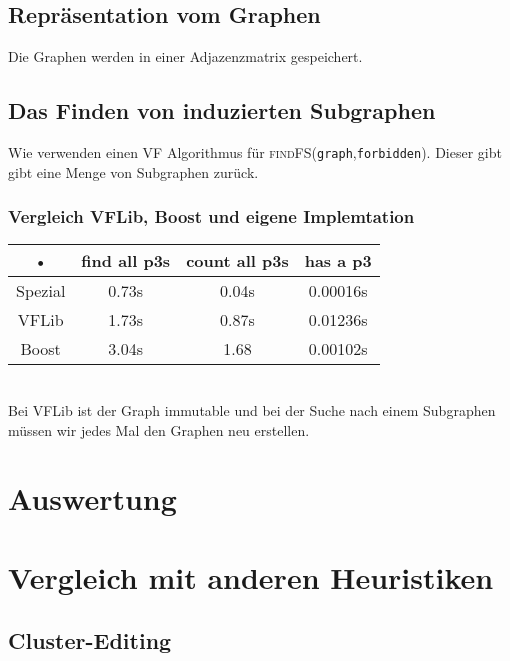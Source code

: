 \documentclass[12pt,a4paper,onecolumn,oneside,titlepage]{article}
\newcommand{\vars}{\texttt}
\newcommand{\func}{\textsc}
\begin{document}
\subsection{Repräsentation vom Graphen}
Die Graphen werden in einer Adjazenzmatrix gespeichert.


\subsection{Das Finden von induzierten Subgraphen}
\cite{Ullmann76}
Wie verwenden einen VF Algorithmus für \func{findFS}(\vars{graph},\vars{forbidden}).
Dieser gibt gibt eine Menge von Subgraphen zurück.

\subsubsection{Vergleich VFLib, Boost und eigene Implemtation}
\begin{tabular}{|c|c|c|c|}
\hline 
• & find all p3s & count all p3s & has a p3 \\ 
\hline 
Spezial & 0.73s & 0.04s & 0.00016s \\ 
\hline 
VFLib & 1.73s & 0.87s & 0.01236s \\ 
\hline 
Boost & 3.04s & 1.68 & 0.00102s \\ 
\hline 
\end{tabular} 
\\

Bei VFLib ist der Graph immutable und bei der Suche nach einem  Subgraphen müssen wir jedes Mal den Graphen neu erstellen.


\section{Auswertung}

\section{Vergleich mit anderen Heuristiken}
\subsection{Cluster-Editing}
\end{document}
